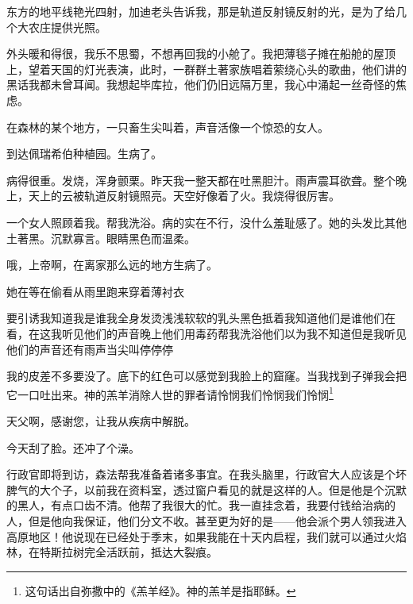 \documentclass[AutoFakeBold=true]{book}
\begin{document}
东方的地平线艳光四射，加迪老头告诉我，那是轨道反射镜反射的光，是为了给几个大农庄提供光照。

外头暖和得很，我乐不思蜀，不想再回我的小舱了。我把薄毯子摊在船舱的屋顶上，望着天国的灯光表演，此时，一群群土著家族唱着萦绕心头的歌曲，他们讲的黑话我都未曾耳闻。我想起毕库拉，他们仍旧远隔万里，我心中涌起一丝奇怪的焦虑。

在森林的某个地方，一只畜生尖叫着，声音活像一个惊恐的女人。

\vspace*{1em}{\kaishu 第六十日：}

到达佩瑞希伯种植园。生病了。

\vspace*{1em}{\kaishu 第六十二日：}

病得很重。发烧，浑身颤栗。昨天我一整天都在吐黑胆汁。雨声震耳欲聋。整个晚上，天上的云被轨道反射镜照亮。天空好像着了火。我烧得很厉害。

一个女人照顾着我。帮我洗浴。病的实在不行，没什么羞耻感了。她的头发比其他土著黑。沉默寡言。眼睛黑色而温柔。

哦，上帝啊，在离家那么远的地方生病了。

\vspace*{1em}{\kaishu 第}

她在等在偷看从雨里跑来穿着薄衬衣

要引诱我知道我是谁我全身发烫浅浅软软的乳头黑色抵着我知道他们是谁他们在看，在这我听见他们的声音晚上他们用毒药帮我洗浴他们以为我不知道但是我听见他们的声音还有雨声当尖叫停停停

我的皮差不多要没了。底下的红色可以感觉到我脸上的窟窿。当我找到子弹我会把它一口吐出来。神的羔羊消除人世的罪者请怜悯我们怜悯我们怜悯\footnote{这句话出自弥撒中的《羔羊经》。神的羔羊是指耶稣。}

\vspace*{1em}{\kaishu 第六十五日：}

天父啊，感谢您，让我从疾病中解脱。

\vspace*{1em}{\kaishu 第六十六日：}

今天刮了脸。还冲了个澡。

行政官即将到访，森法帮我准备着诸多事宜。在我头脑里，行政官大人应该是个坏脾气的大个子，以前我在资料室，透过窗户看见的就是这样的人。但是他是个沉默的黑人，有点口齿不清。他帮了我很大的忙。我一直挂念着，我要付钱给治病的人，但是他向我保证，他们分文不收。甚至更为好的是——他会派个男人领我进入高原地区！他说现在已经处于季末，如果我能在十天内启程，我们就可以通过火焰林，在特斯拉树完全活跃前，抵达大裂痕。
\end{document}
